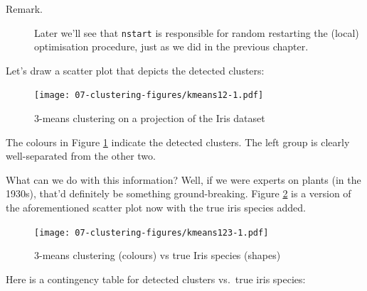 \documentclass[10pt,b5paper,krantz1]{krantz}
\newenvironment{Shaded}{\begin{snugshade}}{\end{snugshade}}
\newcommand{\DataTypeTok}[1]{\textcolor[rgb]{0.27,0.27,0.27}{#1}}
\newcommand{\KeywordTok}[1]{\textcolor[rgb]{0.27,0.27,0.27}{\textbf{#1}}}
\newcommand{\NormalTok}[1]{#1}
\newcommand{\OperatorTok}[1]{\textcolor[rgb]{0.43,0.43,0.43}{\textbf{#1}}}
\newcommand{\StringTok}[1]{\textcolor[rgb]{0.5,0.5,0.5}{#1}}
\begin{document}
\begin{description}
\item[Remark.]
Later we'll see that \texttt{nstart} is responsible for random restarting the
(local) optimisation procedure, just as we did in the previous chapter.
\end{description}

Let's draw a scatter plot that depicts the detected clusters:

\begin{Shaded}
\end{Shaded}

\begin{figure}
\hypertarget{fig:kmeans12}{%
\centering
\texttt{[image: 07-clustering-figures/kmeans12-1.pdf]}
\caption{3-means clustering on a projection of the Iris dataset}\label{fig:kmeans12}
}
\end{figure}

The colours in Figure \ref{fig:kmeans12} indicate the detected clusters.
The left group is clearly well-separated from the other two.

What can we do with this information? Well, if we were experts on plants
(in the 1930s), that'd definitely be something ground-breaking.
Figure \ref{fig:kmeans123} is a version of the aforementioned scatter plot
now with the true iris species added.

\begin{Shaded}
\end{Shaded}

\begin{figure}
\hypertarget{fig:kmeans123}{%
\centering
\texttt{[image: 07-clustering-figures/kmeans123-1.pdf]}
\caption{3-means clustering (colours) vs true Iris species (shapes)}\label{fig:kmeans123}
}
\end{figure}

Here is a contingency table for detected clusters vs.~true iris species:

\begin{Shaded}
\end{Shaded}
\end{document}
